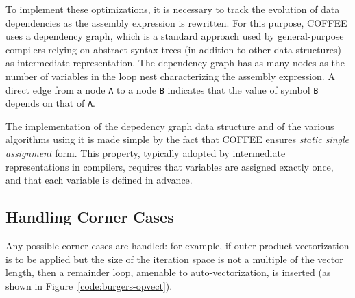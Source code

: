 To implement these optimizations, it is necessary to track the evolution of data dependencies as the assembly expression is rewritten. For this purpose, COFFEE uses a dependency graph, which is a standard approach used by general-purpose compilers relying on abstract syntax trees (in addition to other data structures) as intermediate representation. The dependency graph has as many nodes as the number of variables in the loop nest characterizing the assembly expression. A direct edge from a node \texttt{A} to a node \texttt{B} indicates that the value of symbol \texttt{B} depends on that of \texttt{A}. 

The implementation of the depedency graph data structure and of the various algorithms using it is made simple by the fact that COFFEE ensures \textit{static single assignment} form. This property, typically adopted by intermediate representations in compilers, requires that variables are assigned exactly once, and that each variable is defined in advance. 

\subsection{Handling Corner Cases}
Any possible corner cases are handled: for example, if outer-product vectorization is to be applied but the size of the iteration space is not a multiple of the vector length, then a remainder loop, amenable to auto-vectorization, is inserted (as shown in Figure~\ref{code:burgers-opvect}).